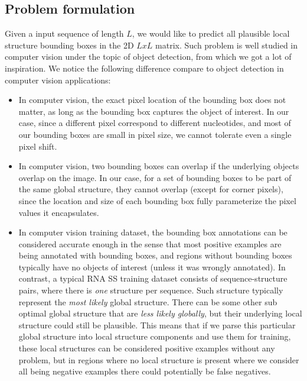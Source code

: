 \documentclass[12pt]{article}
\begin{document}
\subsection{Problem formulation}

Given a input sequence of length $L$,
we would like to predict all plausible local structure bounding boxes in the 2D $L x L$ matrix.
Such problem is well studied in computer vision under the topic of object detection,
from which we got a lot of inspiration.
We notice the following difference compare to object detection in computer vision applications:

\begin{itemize}
    \item In computer vision, the exact pixel location of the bounding box does not matter,
    as long as the bounding box captures the object of interest.
    In our case, since a different pixel correspond to different nucleotides,
    and most of our bounding boxes are small in pixel size, we cannot tolerate even a single pixel shift.

    \item In computer vision, two bounding boxes can overlap
    if the underlying objects overlap on the image. In our case, for a set of bounding boxes to
    be part of the same global structure, they cannot overlap (except for corner pixels),
    since the location and size of each bounding box fully parameterize the pixel values it encapsulates.

    \item In computer vision training dataset, the bounding box annotations can be considered
    accurate enough in the sense that most positive examples are being annotated with bounding boxes,
    and regions without bounding boxes typically have no objects of interest (unless it was wrongly annotated).
    In contrast, a typical RNA SS training dataset consists of sequence-structure pairs,
    where there is \textit{one} structure per sequence. Such structure typically represent the \textit{most likely}
    global structure. There can be some other sub optimal global structure that are \textit{less likely globally},
    but their underlying local structure could still be plausible.
    This means that if we parse this particular global structure into local structure components and use them for training,
    these local structures can be considered positive examples without any problem,
    but in regions where no local structure is present where we consider all being negative examples there could potentially be false negatives.
\end{itemize}
\end{document}
